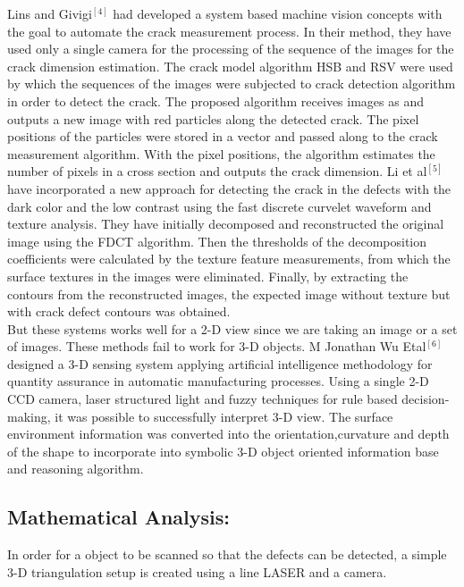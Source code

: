 \documentclass[12pt]{article}
\begin{document}
{\quad}Lins and Givigi$^{[4]}$ had developed a system based machine vision concepts with the goal to automate the crack measurement process. In their method, they have used only a single camera for the processing of the sequence of the images for the crack dimension estimation. The crack model algorithm HSB and RSV were used by which the sequences of the images were subjected to crack detection algorithm in order to detect the crack. The proposed algorithm receives images as and outputs a new image with red particles along the detected crack. The pixel positions of the particles were stored in a vector and passed along to the crack measurement algorithm. With the pixel positions, the algorithm estimates the number of pixels in a cross section and outputs the crack dimension. Li et al$^{[5]}$ have incorporated a new approach for detecting the crack in the defects with the dark color and the low contrast using the fast discrete curvelet waveform and texture analysis. They have initially decomposed and reconstructed the original image using the FDCT algorithm. Then the thresholds of the decomposition coefficients were calculated by the texture feature measurements, from which the surface textures in the images were eliminated. Finally, by extracting the contours from the reconstructed images, the expected image without texture but with crack defect contours was obtained.\\

{\quad}But these systems works well for a 2-D view since we are taking an image or a set of images. These methods fail to work for 3-D objects. M Jonathan Wu Etal$^{[6]}$ designed a 3-D sensing system applying artificial intelligence methodology for quantity assurance in automatic manufacturing processes. Using a single 2-D CCD camera, laser structured light and fuzzy techniques for rule based decision-making, it was possible to successfully interpret 3-D view. The surface environment information was converted into the orientation,curvature and depth of the shape to incorporate into symbolic 3-D object oriented information base and reasoning algorithm.\\




\subsection{Mathematical Analysis:}
{\quad}In order for a object to be scanned so that the defects can be detected, a simple 3-D triangulation setup is created using a line LASER and a camera.\\
\end{document}
